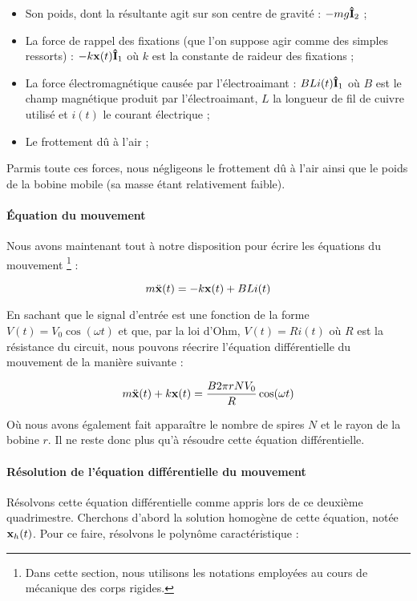\begin{itemize}
	\item Son poids, dont la résultante agit sur son centre de gravité : $-mg{\bf\hat{ I}}_2$ ;
	\item La force de rappel des fixations (que l'on suppose agir comme des simples
	ressorts) : $-k {\bf x}(t) {\bf\hat{ I}}_1$ où $k$ est la constante de raideur des fixations ;
	\item La force électromagnétique causée par l'électroaimant : $BLi(t) {\bf\hat{ I}}_1$ où
	$B$ est le champ magnétique produit par l'électroaimant, $L$ la longueur de fil de cuivre
	utilisé et $i(t)$ le courant électrique ;
	\item Le frottement dû à l'air ;
\end{itemize}

Parmis toute ces forces, nous négligeons le frottement dû à l'air ainsi que le poids
de la bobine mobile (sa masse étant relativement faible).

\paragraph{Équation du mouvement}
Nous avons maintenant tout à notre disposition pour écrire les équations du mouvement
\footnote{Dans cette section, nous utilisons les notations employées au cours de
mécanique des corps rigides.} :

$$m\ddot{\bf x}(t) = -k{\bf x}(t) + BLi(t)$$

En sachant que le signal d'entrée est une fonction de la forme $V(t) = V_0 \cos (\omega t)$ et
que, par la loi d'Ohm, $V(t) = Ri(t)$ où $R$ est la résistance du circuit, 
nous pouvons réecrire l'équation différentielle du mouvement de la manière suivante :

$$m\ddot{\bf x}(t) + k{\bf x}(t) = \frac{B2\pi rNV_0}{R}\cos (\omega t)$$

Où nous avons également fait apparaître le nombre de spires $N$ et le rayon de la bobine
$r$. Il ne reste donc plus qu'à résoudre cette équation différentielle.

\paragraph{Résolution de l'équation différentielle du mouvement}
Résolvons cette équation différentielle comme appris lors de ce deuxième
quadrimestre. Cherchons d'abord la solution homogène de cette équation, notée ${\bf x}_h(t)$.
Pour ce faire, résolvons le polynôme caractéristique :

